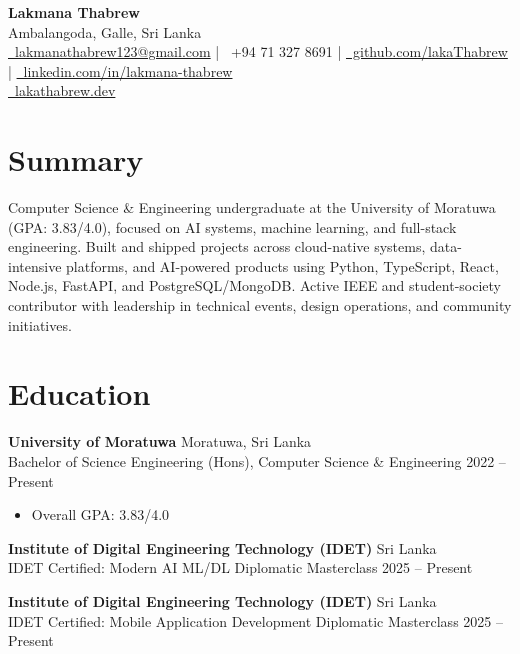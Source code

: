\documentclass[a4paper,11pt]{article}
\begin{document}
\pagestyle{empty}

\begin{center}
{\LARGE \textbf{Lakmana Thabrew}} \\
Ambalangoda, Galle, Sri Lanka \\
\href{mailto:lakmanathabrew123@gmail.com}{\faEnvelope\ lakmanathabrew123@gmail.com} \;|\;
\faPhone\ +94 71 327 8691 \;|\;
\href{https://github.com/lakaThabrew}{\faGithub\ github.com/lakaThabrew} \;|\;
\href{https://linkedin.com/in/lakmana-thabrew}{\faLinkedin\ linkedin.com/in/lakmana-thabrew} \\
\href{https://lakathabrew.dev}{\faGlobe\ lakathabrew.dev}
\end{center}

\section*{Summary}
Computer Science \& Engineering undergraduate at the University of Moratuwa (GPA: 3.83/4.0), focused on AI systems, machine learning, and full-stack engineering. Built and shipped projects across cloud-native systems, data-intensive platforms, and AI-powered products using Python, TypeScript, React, Node.js, FastAPI, and PostgreSQL/MongoDB. Active IEEE and student-society contributor with leadership in technical events, design operations, and community initiatives.

\section*{Education}
\textbf{University of Moratuwa} \hfill Moratuwa, Sri Lanka \\
Bachelor of Science Engineering (Hons), Computer Science \& Engineering \hfill 2022 -- Present
\begin{itemize}
    \item Overall GPA: 3.83/4.0
\end{itemize}

\textbf{Institute of Digital Engineering Technology (IDET)} \hfill Sri Lanka \\
IDET Certified: Modern AI ML/DL Diplomatic Masterclass \hfill 2025 -- Present

\textbf{Institute of Digital Engineering Technology (IDET)} \hfill Sri Lanka \\
IDET Certified: Mobile Application Development Diplomatic Masterclass \hfill 2025 -- Present
\end{document}
